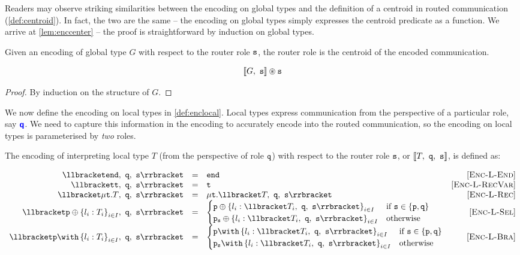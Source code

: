 Readers may observe striking similarities between
the encoding on global types and the definition of a
centroid in routed communication (\cref{def:centroid}).
In fact, the two are the same -- the encoding on global
types simply expresses the centroid predicate as a function.
We arrive at \cref{lem:enccenter} -- the proof is straightforward
by induction on global types.

\begin{lemma}
Given an encoding of global type $G$ with respect to the
router role ${\mathtt{s}}$,
the router role is the centroid of the encoded communication.

\[
{\llbracket {G},~{\mathtt{s}} \rrbracket} \circledast {\mathtt{s}}
\]

\label{lem:enccenter}
\end{lemma}

\begin{proof}
By induction on the structure of $G$.
\end{proof}

We now define the encoding on local types in \cref{def:enclocal}.
Local types express communication from the perspective of a 
particular role, say ${\color{blue}\bm{\mathsf{q}}}$. 
We need to capture this information in the encoding
to accurately encode into the routed communication,
so the encoding on local types is parameterised by
\textit{two} roles.

\begin{definition}
The encoding of interpreting local type $T$ (from the
perspective of role ${\mathtt{q}}$) with respect to
the router role ${\mathtt{s}}$, or $\llbracket {T},~{\mathtt{q}},~{\mathtt{s}} \rrbracket$, is defined as:

\doublespacing
\[
\begin{array}{rclr}
\enclocal{\tend}{q}{s} &= & \tend & \rulename{Enc-L-End} \\
\enclocal{\trecvar}{q}{s} &= & \trecvar & \rulename{Enc-L-RecVar} \\
\enclocal{\trec{T}}{q}{s} &= & \trec{\enclocal{T}{q}{s}} 
	& \rulename{Enc-L-Rec} \\
\enclocal{\tsel{p}{l_i: T_i}{i\in I}}{q}{s} &= 
	& \begin{cases}
	\tsel{p}{l_i: \enclocal{T_i}{q}{s}}{i\in I}
		& \text{if } \mrole{s} \in \{ \mrole{p}, \mrole{q} \} \\
	\tselproxy{p}{s}{l_i: \enclocal{T_i}{q}{s}}{i\in I}
		& \text{otherwise} \\	
	\end{cases}
	& \rulename{Enc-L-Sel} \\
\enclocal{\tbra{p}{l_i: T_i}{i\in I}}{q}{s} &= 
	& \begin{cases}
	\tbra{p}{l_i: \enclocal{T_i}{q}{s}}{i\in I}
		& \text{if } \mrole{s} \in \{ \mrole{p}, \mrole{q} \} \\
	\tbraproxy{p}{s}{l_i: \enclocal{T_i}{q}{s}}{i\in I}
		& \text{otherwise} \\	
	\end{cases}
	& \rulename{Enc-L-Bra} \\
\end{array}
\]
\singlespacing

\label{def:enclocal}
\end{definition}

